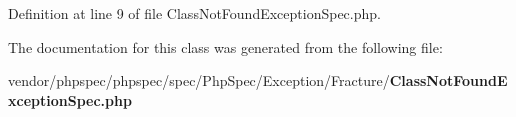 Definition at line 9 of file Class\+Not\+Found\+Exception\+Spec.\+php.



The documentation for this class was generated from the following file\+:\begin{DoxyCompactItemize}
\item 
vendor/phpspec/phpspec/spec/\+Php\+Spec/\+Exception/\+Fracture/{\bf Class\+Not\+Found\+Exception\+Spec.\+php}\end{DoxyCompactItemize}
